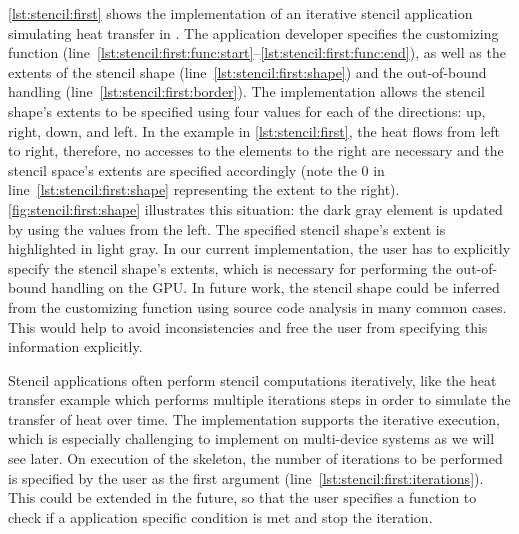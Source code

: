 \autoref{lst:stencil:first} shows the implementation of an iterative stencil application simulating heat transfer in \SkelCL.
The application developer specifies the customizing function (line~\ref{lst:stencil:first:func:start}--\ref{lst:stencil:first:func:end}), as well as the extents of the stencil shape (line~\ref{lst:stencil:first:shape}) and the out-of-bound handling (line~\ref{lst:stencil:first:border}).
The  implementation allows the stencil shape's extents to be specified using four values for each of the directions:
up, right, down, and left.
In the example in \autoref{lst:stencil:first}, the heat flows from left to right, therefore, no accesses to the elements to the right are necessary and the stencil space's extents are specified accordingly (note the $0$ in line~\ref{lst:stencil:first:shape} representing the extent to the right).
\autoref{fig:stencil:first:shape} illustrates this situation: the dark gray element is updated by using the values from the left.
The specified stencil shape's extent is highlighted in light gray.
In our current implementation, the user has to explicitly specify the stencil shape's extents, which is necessary for performing the out-of-bound handling on the GPU.
In future work, the stencil shape could be inferred from the customizing function using source code analysis in many common cases.
This would help to avoid inconsistencies and free the user from specifying this information explicitly.

Stencil applications often perform stencil computations iteratively, like the heat transfer example which performs multiple iterations steps in order to simulate the transfer of heat over time.
The  implementation supports the iterative execution, which is especially challenging to implement on multi-device systems as we will see later.
On execution of the skeleton, the number of iterations to be performed is specified by the user as the first argument (line~\ref{lst:stencil:first:iterations}).
This could be extended in the future, so that the user specifies a function to check if a application specific condition is met and stop the iteration.


